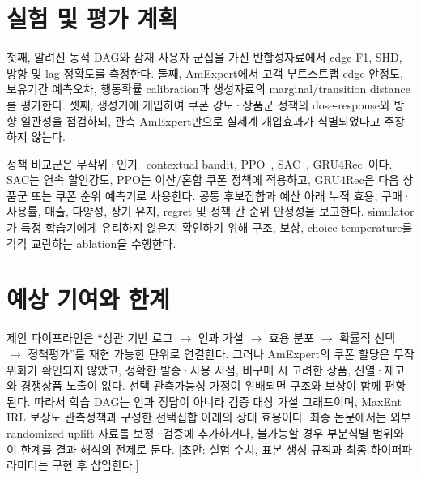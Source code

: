 \documentclass[11pt,twocolumn]{article}
\newcommand{\draftnote}[1]{\textcolor{red!65!black}{[초안: #1]}}
\begin{document}
\section{실험 및 평가 계획}
첫째, 알려진 동적 DAG와 잠재 사용자 군집을 가진 반합성자료에서 edge F1, SHD, 방향 및 lag
정확도를 측정한다. 둘째, AmExpert에서 고객 부트스트랩 edge 안정도, 보유기간 예측오차,
행동확률 calibration과 생성자료의 marginal/transition distance를 평가한다. 셋째, 생성기에
개입하여 쿠폰 강도·상품군 정책의 dose-response와 방향 일관성을 점검하되, 관측 AmExpert만으로
실세계 개입효과가 식별되었다고 주장하지 않는다.

정책 비교군은 무작위·인기·contextual bandit, PPO~\cite{schulman2017}, SAC~\cite{haarnoja2018},
GRU4Rec~\cite{hidasi2016}이다. SAC는 연속 할인강도, PPO는 이산/혼합 쿠폰 정책에 적용하고,
GRU4Rec은 다음 상품군 또는 쿠폰 순위 예측기로 사용한다. 공통 후보집합과 예산 아래 누적 효용,
구매·사용률, 매출, 다양성, 장기 유지, regret 및 정책 간 순위 안정성을 보고한다. simulator가
특정 학습기에게 유리하지 않은지 확인하기 위해 구조, 보상, choice temperature를 각각
교란하는 ablation을 수행한다.

\section{예상 기여와 한계}
제안 파이프라인은 ``상관 기반 로그 $\rightarrow$ 인과 가설 $\rightarrow$ 효용 분포
$\rightarrow$ 확률적 선택 $\rightarrow$ 정책평가''를 재현 가능한 단위로 연결한다. 그러나
AmExpert의 쿠폰 할당은 무작위화가 확인되지 않았고, 정확한 발송·사용 시점, 비구매 시 고려한
상품, 진열·재고와 경쟁상품 노출이 없다. 선택-관측가능성 가정이 위배되면 구조와 보상이 함께
편향된다. 따라서 학습 DAG는 인과 정답이 아니라 검증 대상 가설 그래프이며, MaxEnt IRL 보상도
관측정책과 구성한 선택집합 아래의 상대 효용이다. 최종 논문에서는 외부 randomized uplift
자료를 보정·검증에 추가하거나, 불가능할 경우 부분식별 범위와 이 한계를 결과 해석의 전제로
둔다. \draftnote{실험 수치, 표본 생성 규칙과 최종 하이퍼파라미터는 구현 후 삽입한다.}
\end{document}
